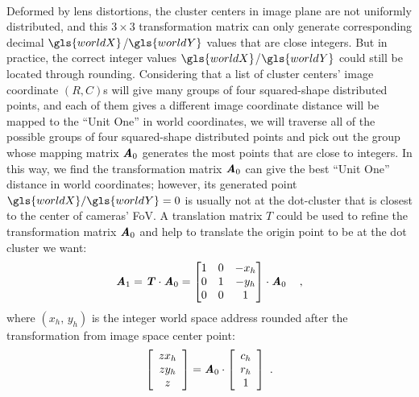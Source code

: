 \\\indent%
Deformed by lens distortions, the cluster centers in image plane are not uniformly distributed, and this $3\times3$ transformation matrix can only generate corresponding decimal \(\gls{worldX}\)/\(\gls{worldY}\) values that are close integers. But in practice, the correct integer values \(\gls{worldX}\)/\(\gls{worldY}\) could still be located through rounding. Considering that a list of cluster centers' image coordinate \((R, C)\)s will give many groups of four squared-shape distributed points, and each of them gives a different image coordinate distance will be mapped to the \enquote{Unit One} in world coordinates, we will traverse all of the possible groups of four squared-shape distributed points and pick out the group whose mapping matrix \(\textbf{\textit{A}}_0\) generates the most points that are close to integers. %
%
In this way, we find the transformation matrix \(\textbf{\textit{A}}_0\) can give the best \enquote{Unit One} distance in world coordinates; however, its generated point \(\gls{worldX}/\gls{worldY} = 0\) is usually not at the dot-cluster that is closest to the center of cameras' \gls{FoV}. A translation matrix \(T\) could be used to refine the transformation matrix \(\textbf{\textit{A}}_0\) and help to translate the origin point to be at the dot cluster we want:%
%
\begin{equation}
%
\textbf{\textit{A}}_1%
= %
\textbf{\textit{T}} \cdot \textbf{\textit{A}}_0 %
= %
\begin{bmatrix} 
1 & 0 & -x_h \\%
0 & 1 & -y_h \\%
0 & 0 &   1 \\%
\end{bmatrix}%
\cdot \textbf{\textit{A}}_0%
\, \, \, \ \ ,%
\end{equation}%
%
where \((x_h, \, y_h)\) is the integer world space address rounded after the transformation from image space center point:%
%
\begin{equation}
%
\left[ \begin{array}{c} %
z x_h \\ z y_h \\ z \end{array} \right] %
= %
\textbf{\textit{A}}_0 \cdot \left[ \begin{array}{c} %
c_h \\ r_h \\ 1 \end{array} \right] %
 \ .%
\end{equation}%
